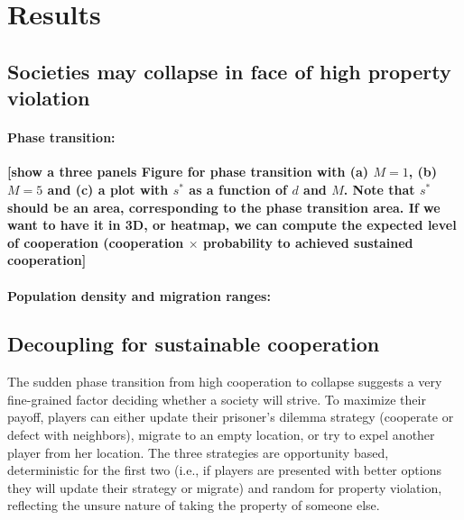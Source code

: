 \section*{Results}

\subsection*{Societies may collapse in face of high property violation}

\paragraph{Phase transition: }

{\bf [show a three panels Figure for phase transition with (a) $M=1$, (b) $M=5$ and (c) a plot with $s^{*}$ as a function of $d$ and $M$. Note that $s^{*}$ should be an area, corresponding to the phase transition area. If we want to have it in 3D, or heatmap, we can compute the expected level of cooperation (cooperation $\times$ probability to achieved sustained cooperation]}

\paragraph{Population density and migration ranges: }


\subsection*{Decoupling for sustainable cooperation}
The sudden phase transition from high cooperation to collapse suggests a very fine-grained factor deciding whether a society will strive. To maximize their payoff, players can either update their prisoner's dilemma strategy (cooperate or defect with neighbors), migrate to an empty location, or try to expel another player from her location. The three strategies are opportunity based, deterministic for the first two (i.e., if players are presented with better options they will update their strategy or migrate) and random for property violation, reflecting the unsure nature of taking the property of someone else. 


